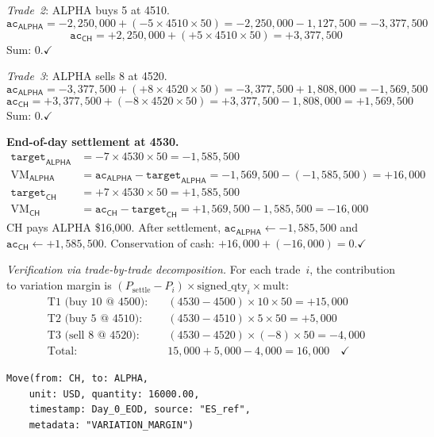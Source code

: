\documentclass[11pt,a4paper]{article}
\begin{document}
\noindent\emph{Trade~2}: ALPHA buys 5 at 4510.
\[
\texttt{ac}_{\textsf{ALPHA}} = -2{,}250{,}000 + (-5 \times 4510 \times 50) = -2{,}250{,}000 - 1{,}127{,}500 = -3{,}377{,}500
\]
\[
\texttt{ac}_{\textsf{CH}} = +2{,}250{,}000 + (+5 \times 4510 \times 50) = +3{,}377{,}500
\]
Sum: $0$.\quad$\checkmark$

\noindent\emph{Trade~3}: ALPHA sells 8 at 4520.
\[
\texttt{ac}_{\textsf{ALPHA}} = -3{,}377{,}500 + (+8 \times 4520 \times 50) = -3{,}377{,}500 + 1{,}808{,}000 = -1{,}569{,}500
\]
\[
\texttt{ac}_{\textsf{CH}} = +3{,}377{,}500 + (-8 \times 4520 \times 50) = +3{,}377{,}500 - 1{,}808{,}000 = +1{,}569{,}500
\]
Sum: $0$.\quad$\checkmark$

\medskip
\noindent\textbf{End-of-day settlement at 4530.}
\begin{align*}
\texttt{target}_{\textsf{ALPHA}} &= -7 \times 4530 \times 50 = -1{,}585{,}500 \\
\text{VM}_{\textsf{ALPHA}} &= \texttt{ac}_{\textsf{ALPHA}} - \texttt{target}_{\textsf{ALPHA}} = -1{,}569{,}500 - (-1{,}585{,}500) = +16{,}000 \\[4pt]
\texttt{target}_{\textsf{CH}} &= +7 \times 4530 \times 50 = +1{,}585{,}500 \\
\text{VM}_{\textsf{CH}} &= \texttt{ac}_{\textsf{CH}} - \texttt{target}_{\textsf{CH}} = +1{,}569{,}500 - 1{,}585{,}500 = -16{,}000
\end{align*}
CH pays ALPHA \$16{,}000.  After settlement, $\texttt{ac}_{\textsf{ALPHA}} \leftarrow -1{,}585{,}500$ and $\texttt{ac}_{\textsf{CH}} \leftarrow +1{,}585{,}500$.
Conservation of cash: $+16{,}000 + (-16{,}000) = 0$.\quad$\checkmark$

\medskip
\noindent\emph{Verification via trade-by-trade decomposition.}
For each trade~$i$, the contribution to variation margin is $(P_{\text{settle}} - P_i) \times \text{signed\_qty}_i \times \text{mult}$:
\begin{align*}
\text{T1 (buy 10 @ 4500):} \quad & (4530 - 4500) \times 10 \times 50 = +15{,}000 \\
\text{T2 (buy 5 @ 4510):} \quad & (4530 - 4510) \times 5 \times 50 = +5{,}000 \\
\text{T3 (sell 8 @ 4520):} \quad & (4530 - 4520) \times (-8) \times 50 = -4{,}000 \\
\text{Total:} \quad & 15{,}000 + 5{,}000 - 4{,}000 = 16{,}000 \quad\checkmark
\end{align*}

\begin{lstlisting}
Move(from: CH, to: ALPHA,
    unit: USD, quantity: 16000.00,
    timestamp: Day_0_EOD, source: "ES_ref",
    metadata: "VARIATION_MARGIN")
\end{lstlisting}
\end{document}
